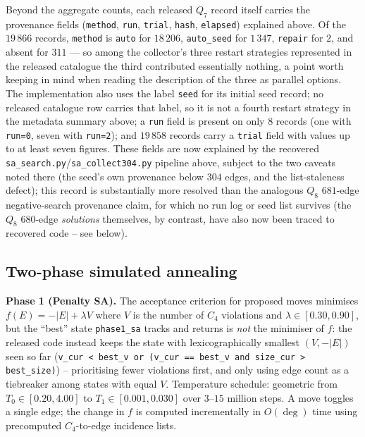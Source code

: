 \documentclass[12pt,a4paper]{article}
\theoremstyle{definition}
\begin{document}
Beyond the aggregate counts, each released $Q_7$ record itself carries
the provenance fields (\texttt{method}, \texttt{run},
\texttt{trial}, \texttt{hash}, \texttt{elapsed}) explained above. Of
the $19\,866$ records, \texttt{method} is \texttt{auto} for $18\,206$,
\texttt{auto\_seed} for $1\,347$, \texttt{repair} for $2$, and absent
for $311$ --- so among the collector's three restart strategies represented in the
released catalogue the third contributed essentially nothing, a point worth
keeping in mind when reading the description of the three as parallel
options. The implementation also uses the label \texttt{seed} for its initial
seed record; no released catalogue row carries that label, so it is not a
fourth restart strategy in the metadata summary above; a \texttt{run} field is present on only $8$ records (one
with \texttt{run=0}, seven with \texttt{run=2}); and $19\,858$ records
carry a \texttt{trial} field with values up to at least seven figures.
These fields are now explained by the recovered
\texttt{sa\_search.py}/\texttt{sa\_collect304.py} pipeline above,
subject to the two caveats noted there (the seed's own provenance
below $304$ edges, and the list-staleness defect); this record is
substantially more resolved than the analogous $Q_8$ $681$-edge
negative-search provenance claim, for which no run log or seed list survives (the $Q_8$ $680$-edge \emph{solutions}
themselves, by contrast, have also now been traced to recovered code
-- see below).

\subsection{Two-phase simulated annealing}

\noindent\textbf{Phase 1 (Penalty SA).}
The acceptance criterion for proposed moves minimises
$f(E)=-|E|+\lambda V$ where $V$ is the number of $C_4$ violations
and $\lambda\in[0.30,0.90]$, but the ``best'' state \texttt{phase1\_sa}
tracks and returns is \emph{not} the minimiser of $f$: the released
code instead keeps the state with lexicographically smallest $(V,-|E|)$
seen so far (\texttt{v\_cur < best\_v or (v\_cur == best\_v and
size\_cur > best\_size)}) -- prioritising fewer violations first, and
only using edge count as a tiebreaker among states with equal $V$.
Temperature schedule: geometric from $T_0\in[0.20,4.00]$ to
$T_1\in[0.001,0.030]$ over $3$--$15$ million steps.
A move toggles a single edge; the change in $f$ is computed incrementally
in $O(\deg)$ time using precomputed $C_4$-to-edge incidence lists.
\end{document}
